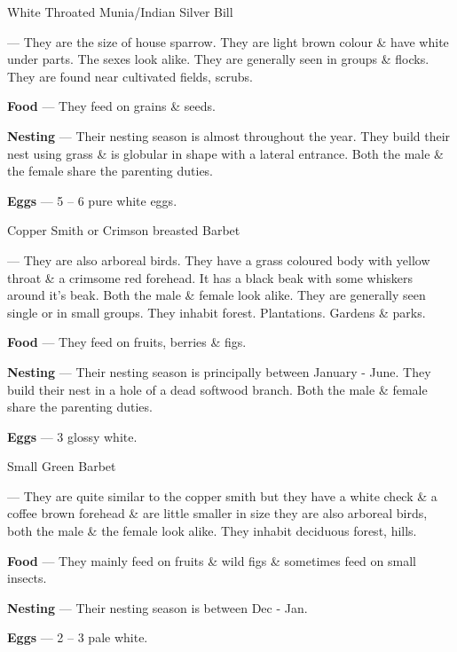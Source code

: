 \begin{bird}{White Throated Munia/Indian Silver Bill}

 --- They are the size of house sparrow. They are light brown colour \& have white under parts. The sexes look alike. They are generally seen in groups \& flocks. They are found near cultivated fields, scrubs. 

{\large\bf Food} --- They feed on grains \& seeds.

{\large\bf Nesting} --- Their nesting season is almost throughout the year. They build their nest using grass \& is globular in shape with a lateral entrance. Both the male \& the female share the parenting duties.

{\large\bf Eggs} --- 5 -- 6 pure white eggs.
\end{bird}

\begin{bird}{Copper Smith or Crimson breasted Barbet}

 --- They are also arboreal birds. They have a grass coloured body with yellow throat \& a crimsome red forehead. It has a black beak with some whiskers around it's beak. Both the male \& female look alike. They are generally seen single or in small groups. They inhabit forest. Plantations. Gardens \& parks.

{\large\bf Food} --- They feed on fruits, berries \& figs.

{\large\bf Nesting} --- Their nesting season is principally between January - June. They build their nest in a hole of a dead softwood branch. Both the male \& female share the parenting duties.

{\large\bf Eggs} --- 3 glossy white.
\end{bird}

\begin{bird}{Small Green Barbet}

 --- They are quite similar to the copper smith but they have a white check \& a coffee brown forehead \& are little smaller in size they are also arboreal birds, both the male \& the female look alike. They inhabit deciduous forest, hills.

{\large\bf Food} --- They mainly feed on fruits \& wild figs \& sometimes feed on small insects.

{\large\bf Nesting} --- Their nesting season is between Dec - Jan.

{\large\bf Eggs} --- 2 -- 3 pale white.
\end{bird}

